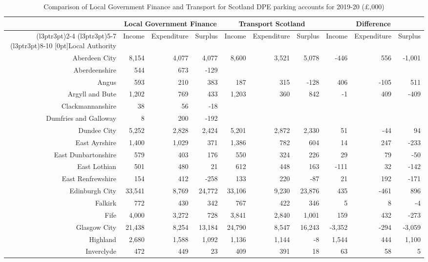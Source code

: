 \documentclass[
  12pt,
]{article}
\begin{document}
\begin{landscape}
\begin{table}[H]
\caption{\label{tab:comparetab}Comparison of Local Government Finance and Transport for Scotland DPE parking accounts for 2019-20 (£,000)}
\centering
\fontsize{7}{9}\selectfont
\begin{tabular}[t]{rrrrrrrrrr}
\toprule
\multicolumn{1}{c}{ } & \multicolumn{3}{c}{Local Government Finance} & \multicolumn{3}{c}{Transport Scotland} & \multicolumn{3}{c}{Difference} \\
\cmidrule(l{3pt}r{3pt}){2-4} \cmidrule(l{3pt}r{3pt}){5-7} \cmidrule(l{3pt}r{3pt}){8-10}
\multirow{1}{*}[0pt]{Local Authority} & Income & Expenditure & Surplus & Income & Expenditure & Surplus & Income & Expenditure & Surplus\\
\midrule
Aberdeen City & 8,154 & 4,077 & 4,077 & 8,600 & 3,521 & 5,078 & -446 & 556 & -1,001\\
Aberdeenshire & 544 & 673 & -129 &  &  &  &  &  & \\
Angus & 593 & 210 & 383 & 187 & 315 & -128 & 406 & -105 & 511\\
Argyll and Bute & 1,202 & 769 & 433 & 1,203 & 360 & 842 & -1 & 409 & -409\\
Clackmannanshire & 38 & 56 & -18 &  &  &  &  &  & \\
Dumfries and Galloway & 8 & 200 & -192 &  &  &  &  &  & \\
Dundee City & 5,252 & 2,828 & 2,424 & 5,201 & 2,872 & 2,330 & 51 & -44 & 94\\
East Ayrshire & 1,400 & 1,029 & 371 & 1,386 & 782 & 604 & 14 & 247 & -233\\
East Dunbartonshire & 579 & 403 & 176 & 550 & 324 & 226 & 29 & 79 & -50\\
East Lothian & 501 & 480 & 21 & 612 & 448 & 163 & -111 & 32 & -142\\
East Renfrewshire & 154 & 412 & -258 & 133 & 220 & -87 & 21 & 192 & -171\\
Edinburgh City & 33,541 & 8,769 & 24,772 & 33,106 & 9,230 & 23,876 & 435 & -461 & 896\\
Falkirk & 772 & 430 & 342 & 767 & 422 & 346 & 5 & 8 & -4\\
Fife & 4,000 & 3,272 & 728 & 3,841 & 2,840 & 1,001 & 159 & 432 & -273\\
Glasgow City & 21,438 & 8,254 & 13,184 & 24,790 & 8,547 & 16,243 & -3,352 & -294 & -3,059\\
Highland & 2,680 & 1,588 & 1,092 & 1,136 & 1,144 & -8 & 1,544 & 444 & 1,100\\
Inverclyde & 472 & 449 & 23 & 409 & 391 & 18 & 63 & 58 & 5\\

\end{tabular}
\end{table}
\end{landscape}
\end{document}
